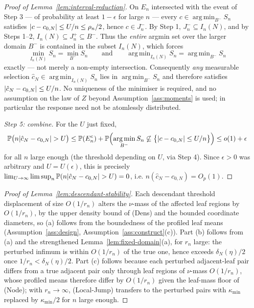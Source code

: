 \documentclass[11pt]{article}
\theoremstyle{plain}
\theoremstyle{definition}
\theoremstyle{remark}
\newcommand{\PP}{\mathbb{P}}
\DeclareMathOperator*{\argmin}{arg\,min}
\DeclarePairedDelimiter{\abs}{\lvert}{\rvert}
\begin{document}
\begin{proof}[Proof of Lemma~\ref{lem:interval-reduction}]
On $E_n$ intersected with the event of Step 3 --- of probability at least
$1-\epsilon$ for large $n$ --- every $c\in\argmin_{B^-}S_n$ satisfies
$\abs{c-c_{0,N}}\le U/n\le\rho_n/2$, hence $c\in J_n^-$. By Step 1,
$J_n^-\subseteq I_n(N)$, and by Steps 1--2, $I_n(N)\subseteq J_n^+\subseteq
B^-$. Thus the \emph{entire} argmin set over the larger domain $B^-$ is
contained in the subset $I_n(N)$, which forces
\[
  \min_{I_n(N)}S_n=\min_{B^-}S_n
  \qquad\text{and}\qquad
  \argmin_{I_n(N)}S_n=\argmin_{B^-}S_n
\]
exactly --- not merely a non-empty intersection. Consequently \emph{any}
measurable selection $\hat c_N\in\argmin_{I_n(N)}S_n$ lies in
$\argmin_{B^-}S_n$ and therefore satisfies $\abs{\hat c_N-c_{0,N}}\le U/n$.
No uniqueness of the minimiser is required, and no assumption on the law of
$Z$ beyond Assumption~\ref{ass:moments} is used; in particular the response
need not be atomlessly distributed.

\emph{Step 5: combine.} For the $U$ just fixed,
\[
  \PP\bigl(n\abs{\hat c_N-c_{0,N}}>U\bigr)
  \le
  \PP(E_n^c)
  +\PP\Bigl(\argmin_{B^-}S_n\not\subseteq
    \bigl\{\abs{c-c_{0,N}}\le U/n\bigr\}\Bigr)
  \le
  o(1)+\epsilon
\]
for all $n$ large enough (the threshold depending on $U$, via Step 4). Since
$\epsilon>0$ was arbitrary and $U=U(\epsilon)$, this is precisely
$\lim_{U\to\infty}\limsup_n\PP(n\abs{\hat c_N-c_{0,N}}>U)=0$, i.e.
$n(\hat c_N-c_{0,N})=O_p(1)$.
\end{proof}

\begin{proof}[Proof of Lemma~\ref{lem:descendant-stability}]
Each descendant threshold displacement of size \(O(1/r_n)\) alters the
\(\nu\)-mass of the affected leaf regions by \(O(1/r_n)\), by the upper
density bound of (Dens) and the bounded coordinate diameters, so (a) follows
from the boundedness of the profiled leaf means
(Assumption~\ref{ass:design}, Assumption~\ref{ass:construct}(c)). Part (b)
follows from (a) and the
strengthened Lemma~\ref{lem:fixed-domain}(a), for \(r_n\) large: the
perturbed infimum is within \(O(1/r_n)\) of the true one, hence exceeds
\(\delta_N(\eta)/2\) once \(1/r_n<\delta_N(\eta)/2\). Part (c) follows
because each perturbed adjacent-leaf pair differs from a true adjacent pair
only through leaf regions of \(\nu\)-mass \(O(1/r_n)\), whose profiled means
therefore differ by \(O(1/r_n)\) given the leaf-mass floor of (Node); with
\(r_n\to\infty\), (Local-Jump) transfers to the perturbed pairs with
\(\kappa_{\min}\) replaced by \(\kappa_{\min}/2\) for \(n\) large enough.
\end{proof}
\end{document}
